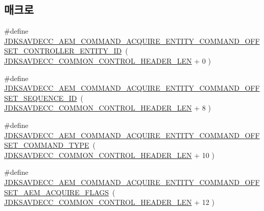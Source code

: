 \subsection*{매크로}
\begin{DoxyCompactItemize}
\item 
\#define \hyperlink{group__command__acquire__entity_ga54037d79f4c31d797f2af0e37b2030cd}{J\+D\+K\+S\+A\+V\+D\+E\+C\+C\+\_\+\+A\+E\+M\+\_\+\+C\+O\+M\+M\+A\+N\+D\+\_\+\+A\+C\+Q\+U\+I\+R\+E\+\_\+\+E\+N\+T\+I\+T\+Y\+\_\+\+C\+O\+M\+M\+A\+N\+D\+\_\+\+O\+F\+F\+S\+E\+T\+\_\+\+C\+O\+N\+T\+R\+O\+L\+L\+E\+R\+\_\+\+E\+N\+T\+I\+T\+Y\+\_\+\+ID}~( \hyperlink{group__jdksavdecc__avtp__common__control__header_gaae84052886fb1bb42f3bc5f85b741dff}{J\+D\+K\+S\+A\+V\+D\+E\+C\+C\+\_\+\+C\+O\+M\+M\+O\+N\+\_\+\+C\+O\+N\+T\+R\+O\+L\+\_\+\+H\+E\+A\+D\+E\+R\+\_\+\+L\+EN} + 0 )
\item 
\#define \hyperlink{group__command__acquire__entity_ga3c90229ba961dd71d0a34d0abd14edb9}{J\+D\+K\+S\+A\+V\+D\+E\+C\+C\+\_\+\+A\+E\+M\+\_\+\+C\+O\+M\+M\+A\+N\+D\+\_\+\+A\+C\+Q\+U\+I\+R\+E\+\_\+\+E\+N\+T\+I\+T\+Y\+\_\+\+C\+O\+M\+M\+A\+N\+D\+\_\+\+O\+F\+F\+S\+E\+T\+\_\+\+S\+E\+Q\+U\+E\+N\+C\+E\+\_\+\+ID}~( \hyperlink{group__jdksavdecc__avtp__common__control__header_gaae84052886fb1bb42f3bc5f85b741dff}{J\+D\+K\+S\+A\+V\+D\+E\+C\+C\+\_\+\+C\+O\+M\+M\+O\+N\+\_\+\+C\+O\+N\+T\+R\+O\+L\+\_\+\+H\+E\+A\+D\+E\+R\+\_\+\+L\+EN} + 8 )
\item 
\#define \hyperlink{group__command__acquire__entity_gaec151554baa7a14fbff3d8203c1cda3d}{J\+D\+K\+S\+A\+V\+D\+E\+C\+C\+\_\+\+A\+E\+M\+\_\+\+C\+O\+M\+M\+A\+N\+D\+\_\+\+A\+C\+Q\+U\+I\+R\+E\+\_\+\+E\+N\+T\+I\+T\+Y\+\_\+\+C\+O\+M\+M\+A\+N\+D\+\_\+\+O\+F\+F\+S\+E\+T\+\_\+\+C\+O\+M\+M\+A\+N\+D\+\_\+\+T\+Y\+PE}~( \hyperlink{group__jdksavdecc__avtp__common__control__header_gaae84052886fb1bb42f3bc5f85b741dff}{J\+D\+K\+S\+A\+V\+D\+E\+C\+C\+\_\+\+C\+O\+M\+M\+O\+N\+\_\+\+C\+O\+N\+T\+R\+O\+L\+\_\+\+H\+E\+A\+D\+E\+R\+\_\+\+L\+EN} + 10 )
\item 
\#define \hyperlink{group__command__acquire__entity_ga40784b624cf3ea2206902bc43b2c5f41}{J\+D\+K\+S\+A\+V\+D\+E\+C\+C\+\_\+\+A\+E\+M\+\_\+\+C\+O\+M\+M\+A\+N\+D\+\_\+\+A\+C\+Q\+U\+I\+R\+E\+\_\+\+E\+N\+T\+I\+T\+Y\+\_\+\+C\+O\+M\+M\+A\+N\+D\+\_\+\+O\+F\+F\+S\+E\+T\+\_\+\+A\+E\+M\+\_\+\+A\+C\+Q\+U\+I\+R\+E\+\_\+\+F\+L\+A\+GS}~( \hyperlink{group__jdksavdecc__avtp__common__control__header_gaae84052886fb1bb42f3bc5f85b741dff}{J\+D\+K\+S\+A\+V\+D\+E\+C\+C\+\_\+\+C\+O\+M\+M\+O\+N\+\_\+\+C\+O\+N\+T\+R\+O\+L\+\_\+\+H\+E\+A\+D\+E\+R\+\_\+\+L\+EN} + 12 )
\item 

\end{DoxyCompactItemize}
